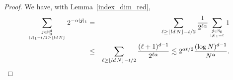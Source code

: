 \documentclass[10pt,a4paper]{amsart}
\newcommand{\bbN}{{\mathbb{N}}}
\newcommand{\bsj}{{\boldsymbol{j}}}
\newcommand{\ld}{{\rm ld}\,}
\begin{document}
\begin{proof}
We have, with Lemma~\ref{index_dim_red},
\begin{eqnarray*}
\sum_{\bsj \in \bbN_{0}^d \atop |\bsj|_1+t/2\geq \lfloor\ld N\rfloor} 2^{- \alpha |\bsj|_1}  & = & \sum_{\ell \ge \lfloor\ld N\rfloor - t/2} \frac{1}{2^{\ell \alpha}} \sum_{\bsj \in \bbN_0 \atop |\bsj|_1=\ell} 1 \\
& \le & \sum_{\ell \ge \lfloor\ld N\rfloor - t/2} \frac{(\ell+1)^{d-1}}{2^{\ell \alpha}} \lesssim  2^{\alpha t/2} \frac{(\log N)^{d-1}}{N^{\alpha}}.
\end{eqnarray*}
\end{proof}
\end{document}
